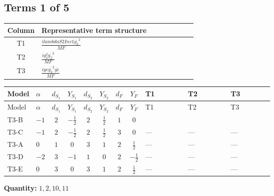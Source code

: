 \documentclass[8pt]{article}
\begin{document}
\begin{landscape}
\subsection*{Terms 1 of 5}
\begin{center}
\begin{tabular}{@{}c >{\raggedright\arraybackslash}p{0.82\linewidth}@{}}
\toprule
Column & Representative term structure \\
\midrule
T1 & \(\displaystyle \frac{i lambdaS2Inv1 \overline{y_{2}}^{2}}{MF}\) \\
\midrule
T2 & \(\displaystyle \frac{i g_{2}^{2} \overline{y_{2}}^{2}}{MF}\) \\
\midrule
T3 & \(\displaystyle \frac{i ye \overline{y_{2}}^{2} \overline{ye}}{MF}\) \\
\midrule
\bottomrule
\end{tabular}
\end{center}
\smallskip
\tiny
\begin{longtable}{@{}llcccccc >{\raggedright\arraybackslash}p{0.21\linewidth} >{\raggedright\arraybackslash}p{0.21\linewidth} >{\raggedright\arraybackslash}p{0.21\linewidth}@{}}
\toprule
Model & $\alpha$ & $d_{S_1}$ & $Y_{S_1}$ & $d_{S_2}$ & $Y_{S_2}$ & $d_F$ & $Y_F$ & T1 & T2 & T3 \\
\midrule
\endfirsthead
\toprule
Model & $\alpha$ & $d_{S_1}$ & $Y_{S_1}$ & $d_{S_2}$ & $Y_{S_2}$ & $d_F$ & $Y_F$ & T1 & T2 & T3 \\
\midrule
\endhead
T3-B & $-1$ & $2$ & $-\frac{1}{2}$ & $2$ & $\frac{1}{2}$ & $1$ & $0$ & \scriptsize\adjustbox{max width=\linewidth}{$\begin{gathered} \frac{i lambdaS2Inv1 \overline{y_{2}}^{2}}{4 MF}\end{gathered}$} & \scriptsize\adjustbox{max width=\linewidth}{$\begin{gathered} \frac{3 i g_{2}^{2} \overline{y_{2}}^{2}}{8 MF}\end{gathered}$} & \scriptsize\adjustbox{max width=\linewidth}{$\begin{gathered} - \frac{i ye \overline{y_{2}}^{2} \overline{ye}}{8 MF}\end{gathered}$} \\
\midrule
T3-C & $-1$ & $2$ & $-\frac{1}{2}$ & $2$ & $\frac{1}{2}$ & $3$ & $0$ & --- & --- & --- \\
\midrule
T3-A & $0$ & $1$ & $0$ & $3$ & $1$ & $2$ & $\frac{1}{2}$ & --- & --- & --- \\
\midrule
T3-D & $-2$ & $3$ & $-1$ & $1$ & $0$ & $2$ & $-\frac{1}{2}$ & --- & --- & --- \\
\midrule
T3-E & $0$ & $3$ & $0$ & $3$ & $1$ & $2$ & $\frac{1}{2}$ & --- & --- & --- \\
\midrule
\bottomrule
\end{longtable}
\clearpage
\noindent\textbf{Quantity: }$\mathrm{1,2,10,11}$\par\smallskip

\end{landscape}
\end{document}
